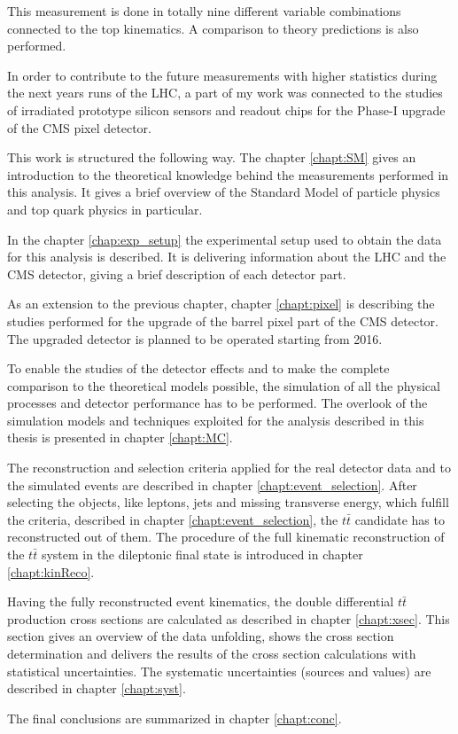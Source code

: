 This measurement is done in totally nine different variable combinations
connected to the top kinematics. A comparison to theory predictions is also performed.

In order to contribute to the future measurements with higher statistics during
the next years runs of the LHC, a part of my work was connected to the studies of irradiated
prototype silicon sensors and readout chips for the Phase-I upgrade of the CMS pixel detector.

This work is structured the following way. The chapter \ref{chapt:SM} gives an introduction to the theoretical
knowledge behind the measurements performed in this analysis. It gives a brief overview of the Standard
Model of particle physics and top quark physics in particular.

In the chapter \ref{chap:exp_setup} the experimental setup used to obtain the data for this analysis is described.
It is delivering information about the LHC and the CMS detector, giving a brief description of each detector part.

As an extension to the previous chapter, chapter \ref{chapt:pixel} is describing the studies performed for the
upgrade of the barrel pixel part of the CMS detector. The upgraded detector is planned to be operated starting from 2016.

To enable the studies of the detector effects and to make the complete comparison to the theoretical models possible,
the simulation of all the physical processes and detector performance has to be performed. The overlook of the simulation
models and techniques exploited for the analysis described in this thesis is presented in chapter \ref{chapt:MC}.

The reconstruction and selection criteria applied for the real detector data and to the simulated events are described
in chapter \ref{chapt:event_selection}. After selecting the objects, like leptons, jets and missing transverse energy, which 
fulfill the criteria, described in chapter \ref{chapt:event_selection}, the $t\bar{t}$ candidate has to reconstructed out
of them. The procedure of the full kinematic reconstruction of the $t\bar{t}$ system in the dileptonic final state is introduced
in chapter \ref{chapt:kinReco}.

Having the fully reconstructed event kinematics, the double differential $t\bar{t}$ production cross sections are calculated
as described in chapter \ref{chapt:xsec}. This section gives an overview of the data unfolding, shows the cross section determination 
and delivers the results of the cross section calculations with statistical uncertainties. The systematic uncertainties (sources and 
values) are described in chapter \ref{chapt:syst}.

The final conclusions are summarized in chapter \ref{chapt:conc}.